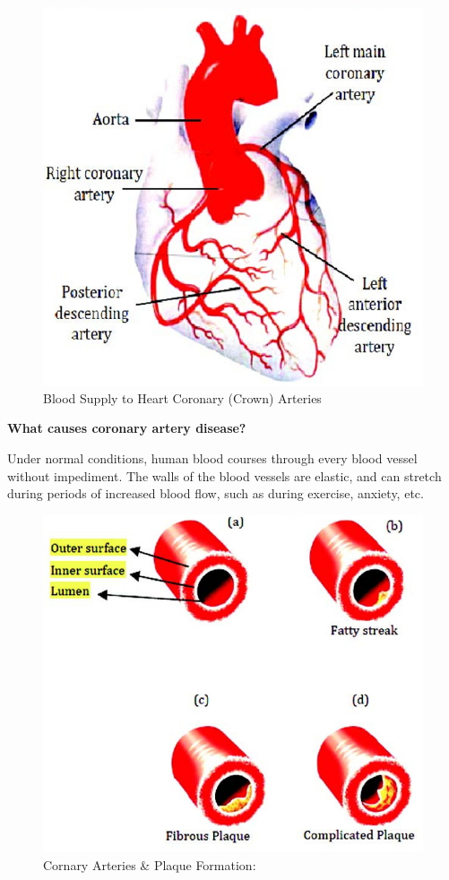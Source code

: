 {\begin{figure}
\includegraphics{images/040.jpg}
\caption{Blood Supply to Heart Coronary (Crown) Arteries}
\end{figure}

\textbf{What causes coronary artery disease?}

Under normal conditions, human blood courses through every blood vessel without impediment. The walls of the blood vessels are elastic, and can stretch during periods of increased blood flow, such as during exercise, anxiety, etc.

\begin{figure}
\includegraphics{images/041.jpg}
\caption{Cornary Arteries \& Plaque Formation:}
\end{figure}

}

